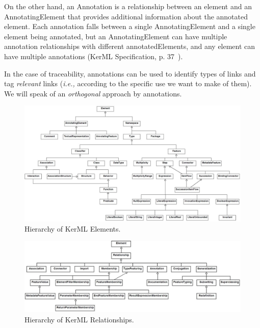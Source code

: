 On the other hand, an Annotation is a relationship between an element and an AnnotatingElement that provides additional information about the annotated element. Each annotation falls between a single AnnotatingElement and a single element being annotated, but an AnnotatingElement can have multiple annotation relationships with different annotatedElements, and any element can have multiple annotations (KerML Specification, p. 37~\cite{kerML}).

In the case of traceability, annotations can be used to identify types of links and tag \textit{relevant} links (\textit{i.e.,} according to the specific use we want to make of them). We will speak of an \textit{orthogonal} approach by annotations. 

\begin{figure}[ht]     
	\centering
	\includegraphics[width=.99\linewidth]{images/kerml-element.png}
	\caption{Hierarchy of KerML Elements.}
	\label{fig:eltshierarchy}
\end{figure}

\begin{figure}[ht]     
	\centering
	\includegraphics[width=.99\linewidth]{images/kerml-relationship.jpg}
	\caption{Hierarchy of KerML Relationships.}
	\label{fig:relhierarchy}
\end{figure}




